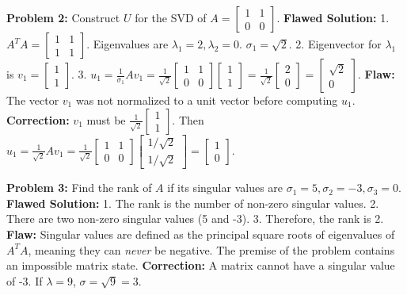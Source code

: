 \documentclass[11pt, letterpaper]{article}
\theoremstyle{definition}
\theoremstyle{remark}
\begin{document}
\vspace{1em}
\textbf{Problem 2:} Construct $U$ for the SVD of $A = \begin{bmatrix} 1 & 1 \\ 0 & 0 \end{bmatrix}$.
\textbf{Flawed Solution:}
1. $A^TA = \begin{bmatrix} 1 & 1 \\ 1 & 1 \end{bmatrix}$. Eigenvalues are $\lambda_1 = 2, \lambda_2 = 0$. $\sigma_1 = \sqrt{2}$.
2. Eigenvector for $\lambda_1$ is $v_1 = \begin{bmatrix} 1 \\ 1 \end{bmatrix}$.
3. $u_1 = \frac{1}{\sigma_1} A v_1 = \frac{1}{\sqrt{2}} \begin{bmatrix} 1 & 1 \\ 0 & 0 \end{bmatrix} \begin{bmatrix} 1 \\ 1 \end{bmatrix} = \frac{1}{\sqrt{2}} \begin{bmatrix} 2 \\ 0 \end{bmatrix} = \begin{bmatrix} \sqrt{2} \\ 0 \end{bmatrix}$.
\textbf{Flaw:} The vector $v_1$ was not normalized to a unit vector before computing $u_1$.
\textbf{Correction:} $v_1$ must be $\frac{1}{\sqrt{2}}\begin{bmatrix} 1 \\ 1 \end{bmatrix}$. Then $u_1 = \frac{1}{\sqrt{2}} A v_1 = \frac{1}{\sqrt{2}} \begin{bmatrix} 1 & 1 \\ 0 & 0 \end{bmatrix} \begin{bmatrix} 1/\sqrt{2} \\ 1/\sqrt{2} \end{bmatrix} = \begin{bmatrix} 1 \\ 0 \end{bmatrix}$.

\vspace{1em}
\textbf{Problem 3:} Find the rank of $A$ if its singular values are $\sigma_1 = 5, \sigma_2 = -3, \sigma_3 = 0$.
\textbf{Flawed Solution:}
1. The rank is the number of non-zero singular values.
2. There are two non-zero singular values (5 and -3).
3. Therefore, the rank is 2.
\textbf{Flaw:} Singular values are defined as the principal square roots of eigenvalues of $A^TA$, meaning they can \textit{never} be negative. The premise of the problem contains an impossible matrix state.
\textbf{Correction:} A matrix cannot have a singular value of -3. If $\lambda = 9$, $\sigma = \sqrt{9} = 3$.
\end{document}
